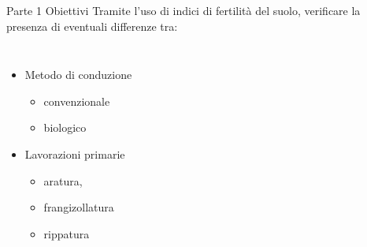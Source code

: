 \documentclass[xcolor={usenames, table, x11names}, final, 10pt]{beamer}
\begin{document}
\begin{frame}{Parte 1 \small{Obiettivi}}
  Tramite l'uso di indici di fertilità del suolo, verificare la
  presenza di eventuali differenze tra:
  \begin{columns}[c]
    \begin{itemize}
    \item<2-> Metodo di conduzione
      \begin{itemize}
      \item <2->      convenzionale
      \item <2->      biologico
      \end{itemize}
    \item<3-> Lavorazioni primarie
      \begin{itemize}
      \item <3->      aratura, 
      \item <3->      frangizollatura
      \item <3->      rippatura        
      \end{itemize}
    \end{itemize}
  \end{columns}
\end{frame}
\end{document}
